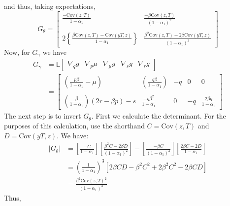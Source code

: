 \documentclass[12pt]{article}
\begin{document}
and thus, taking expectations,
\[
  G_{\theta} = 
  \left[
  \begin{array}{cc}
    \displaystyle \frac{-\mbox{Cov}(z,T)}{1 - \alpha_1} & \displaystyle  \frac{-\beta \mbox{Cov}(z,T)}{(1 - \alpha_1)^2} \\ \\
    \displaystyle 2\left\{ \frac{\beta\mbox{Cov}(z,T) - \mbox{Cov}(yT,z) }{1 - \alpha_1} \right\} & \displaystyle \frac{ \beta^2\mbox{Cov}(z,T) - 2\beta \mbox{Cov}(yT,z)}{(1 - \alpha_1)^2} 
  \end{array}
\right]
\]
Now, for $G_\gamma$ we have
\begin{align*}
  G_\gamma &= \mathbb{E}
  \left[
  \begin{array}{ccccc}
    \nabla_q g & \nabla_p \mu & \nabla_\mu g & \nabla_s g & \nabla_r g
  \end{array}
\right] \\
&=
\left[
\begin{array}{ccccc}
  \displaystyle \left( \frac{p\beta}{1 - \alpha_1}  - \mu \right)  & \displaystyle\left(\frac{q\beta}{1 - \alpha_1}\right)& -q & 0 & 0 \\ \\
  \displaystyle\left( \frac{\beta}{1 - \alpha_1} \right)(2r - \beta p) - s &\displaystyle \frac{-q\beta^2}{1 - \alpha_1} & 0 & -q & \displaystyle \frac{2\beta q}{1 - \alpha_1}
\end{array}
\right]
\end{align*}
The next step is to invert $G_\theta$.
First we calculate the determinant.
For the purposes of this calculation, use the shorthand $C = \mbox{Cov}(z,T)$ and $D = \mbox{Cov}(yT,z)$.
We have:
\begin{align*}
  |G_\theta| &= \left[ \frac{-C}{1 - \alpha_1} \right]\left[ \frac{\beta^2 C - 2\beta D}{(1 - \alpha_1)^2} \right] - \left[ \frac{-\beta C}{(1 - \alpha_1)^2} \right]\left[ \frac{2\beta C - 2D}{1 - \alpha_1} \right]\\
  &= \left( \frac{1}{1 - \alpha_1} \right)^3 \left[ 2\beta C D - \beta^2 C^2 + 2\beta^2 C^2 - 2\beta CD  \right]\\
  &= \frac{\beta^2 \mbox{Cov}(z,T)^2}{(1 - \alpha_1)^3} 
\end{align*}
Thus,
\end{document}
